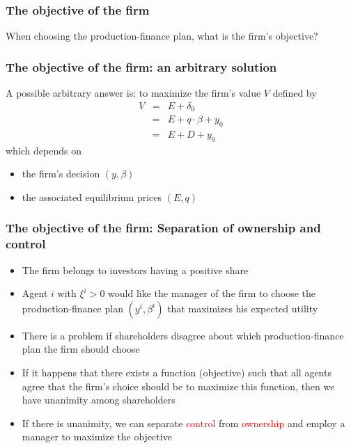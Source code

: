 \documentclass[blue]{beamer}
\theoremstyle{definition}
\theoremstyle{example}
\begin{document}

\begin{frame}\frametitle{The objective of the firm}

\alert{
When choosing the production-finance plan, what is the firm's objective?
}

\end{frame}


\begin{frame}\frametitle{The objective of the firm: an arbitrary solution}

A possible \alert{arbitrary} answer is: to maximize the firm's value $V$ defined by
\begin{eqnarray*}
V & = & E + \delta_0 \\
 & = & E + q \cdot \beta + y_0 \\
 &  = & E + D + y_0
\end{eqnarray*}
which depends on
    \begin{itemize}
    \item the firm's decision $(y,\beta)$
    \item the associated equilibrium prices $(E,q)$
    \end{itemize}

\end{frame}


\begin{frame}\frametitle{The objective of the firm: Separation of ownership and control}

\begin{itemize}
\item The firm belongs to investors having a positive share
\item Agent $i$ with $\xi^i>0$ would like the manager of the firm to choose the production-finance plan $(y^i,\beta^i)$ that maximizes his expected utility
\item There is a problem if shareholders disagree about which production-finance plan the firm should choose
\item If it happens that there exists a function (objective) such that all agents agree that the firm's choice should be to maximize this function, then we have unanimity among shareholders
\item If there is unanimity, we can separate \textcolor{red}{control} from \textcolor{red}{ownership} and employ a manager to maximize the objective
\end{itemize}

\end{frame}
\end{document}

